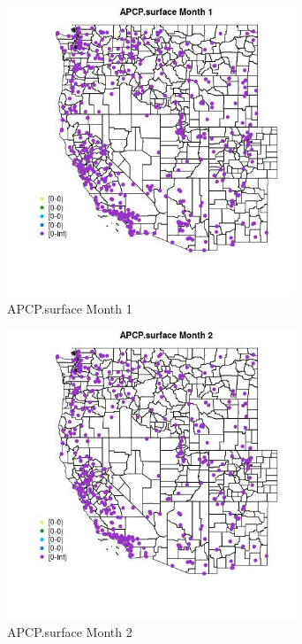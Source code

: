 \begin{figure} 
\centering  
\includegraphics[width=0.77\textwidth]{Code_Outputs/Report_ML_input_PM25_Step4_part_e_de_duplicated_aves_compiled_2019-05-18wNAs_MapObsMo1APCPsurface.jpg} 
\caption{\label{fig:Report_ML_input_PM25_Step4_part_e_de_duplicated_aves_compiled_2019-05-18wNAsMapObsMo1APCPsurface}APCP.surface Month 1} 
\end{figure} 
 

\begin{figure} 
\centering  
\includegraphics[width=0.77\textwidth]{Code_Outputs/Report_ML_input_PM25_Step4_part_e_de_duplicated_aves_compiled_2019-05-18wNAs_MapObsMo2APCPsurface.jpg} 
\caption{\label{fig:Report_ML_input_PM25_Step4_part_e_de_duplicated_aves_compiled_2019-05-18wNAsMapObsMo2APCPsurface}APCP.surface Month 2} 
\end{figure} 
 

